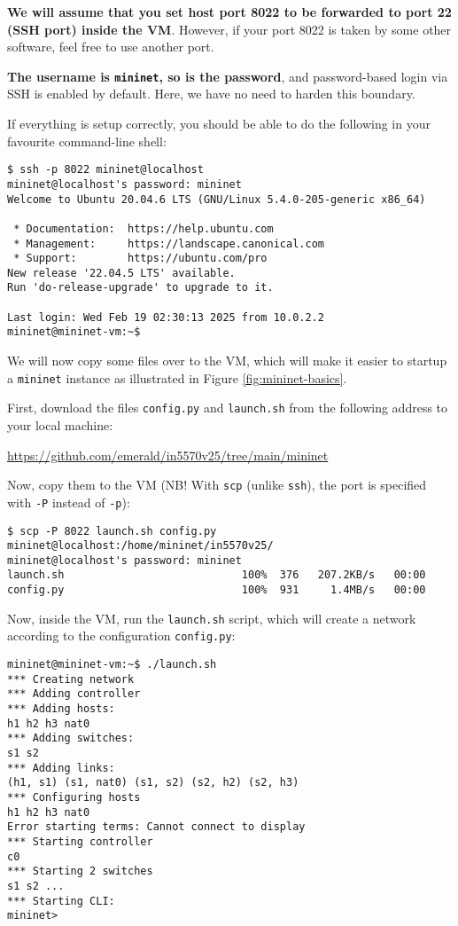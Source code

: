 \documentclass{article}
\newcommand{\mininet}{\texttt{mininet}}
\begin{document}
\textbf{We will assume that you set host port 8022 to be forwarded to
port 22 (SSH port) inside the VM}. However, if your port 8022 is taken
by some other software, feel free to use another port.

\textbf{The username is \texttt{mininet}, so is the password}, and
password-based login via SSH is enabled by default. Here, we have no need
to harden this boundary.

If everything is setup correctly, you should be able to do the
following in your favourite command-line shell:

\begin{lstlisting}
$ ssh -p 8022 mininet@localhost
mininet@localhost's password: mininet
Welcome to Ubuntu 20.04.6 LTS (GNU/Linux 5.4.0-205-generic x86_64)

 * Documentation:  https://help.ubuntu.com
 * Management:     https://landscape.canonical.com
 * Support:        https://ubuntu.com/pro
New release '22.04.5 LTS' available.
Run 'do-release-upgrade' to upgrade to it.

Last login: Wed Feb 19 02:30:13 2025 from 10.0.2.2
mininet@mininet-vm:~$
\end{lstlisting}

We will now copy some files over to the VM, which will make it easier
to startup a \mininet{} instance as illustrated in Figure \ref{fig:mininet-basics}.

First, download the files \texttt{config.py} and \texttt{launch.sh}
from the following address to your local machine:

\begin{center}
\url{https://github.com/emerald/in5570v25/tree/main/mininet}
\end{center}

Now, copy them to the VM (NB! With \texttt{scp} (unlike \texttt{ssh}),
the port is specified with \texttt{-P} instead of \texttt{-p}):

\begin{lstlisting}
$ scp -P 8022 launch.sh config.py mininet@localhost:/home/mininet/in5570v25/
mininet@localhost's password: mininet
launch.sh                            100%  376   207.2KB/s   00:00
config.py                            100%  931     1.4MB/s   00:00
\end{lstlisting}

Now, inside the VM, run the \texttt{launch.sh} script, which will
create a network according to the configuration \texttt{config.py}:

\begin{lstlisting}
mininet@mininet-vm:~$ ./launch.sh
*** Creating network
*** Adding controller
*** Adding hosts:
h1 h2 h3 nat0
*** Adding switches:
s1 s2
*** Adding links:
(h1, s1) (s1, nat0) (s1, s2) (s2, h2) (s2, h3)
*** Configuring hosts
h1 h2 h3 nat0
Error starting terms: Cannot connect to display
*** Starting controller
c0
*** Starting 2 switches
s1 s2 ...
*** Starting CLI:
mininet>
\end{lstlisting}
\end{document}
